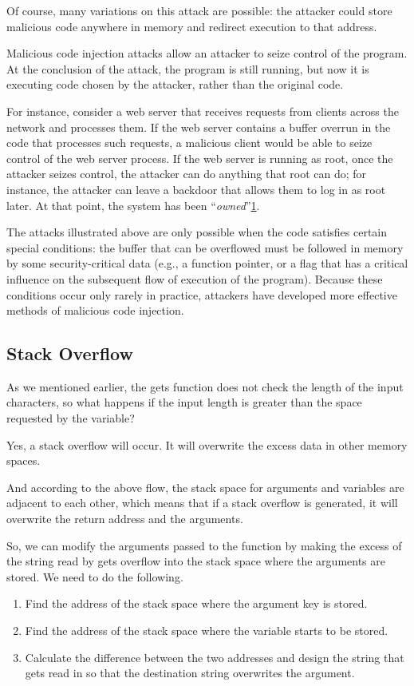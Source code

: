 \documentclass[a4paper]{exam}
\theoremstyle{definition}
\begin{document}
Of course, many variations on this attack are possible: the attacker
could store malicious code anywhere in memory and redirect execution to
that address.

Malicious code injection attacks allow an attacker to seize control of
the program. At the conclusion of the attack, the program is still
running, but now it is executing code chosen by the attacker, rather
than the original code.

For instance, consider a web server that receives requests from clients
across the network and processes them. If the web server contains a
buffer overrun in the code that processes such requests, a malicious
client would be able to seize control of the web server process. If the
web server is running as root, once the attacker seizes control, the
attacker can do anything that root can do; for instance, the attacker
can leave a backdoor that allows them to log in as root later. At that
point, the system has been
``\emph{owned}''\href{https://textbook.cs161.org/memory-safety/vulnerabilities.html\#fn:1}{1}.

The attacks illustrated above are only possible when the code satisfies
certain special conditions: the buffer that can be overflowed must be
followed in memory by some security-critical data (e.g., a function
pointer, or a flag that has a critical influence on the subsequent flow
of execution of the program). Because these conditions occur only rarely
in practice, attackers have developed more effective methods of
malicious code injection.
\subsection{Stack Overflow \cite{pwnutil}}
As we mentioned earlier, the gets function does not check the length of the input characters, so what happens if the input length is greater than the space requested by the variable?

 Yes, a stack overflow will occur. It will overwrite the excess data in other memory spaces.

 And according to the above flow, the stack space for arguments and variables are adjacent to each other, which means that if a stack overflow is generated, it will overwrite the return address and the arguments.
 
So, we can modify the arguments passed to the function by making the excess of the string read by gets overflow into the stack space where the arguments are stored.
We need to do the following.
\begin{enumerate}
    \item Find the address of the stack space where the argument key is stored.
    \item Find the address of the stack space where the variable starts to be stored.
    \item Calculate the difference between the two addresses and design the string that gets read in so that the destination string overwrites the argument.
\end{enumerate}
\end{document}
